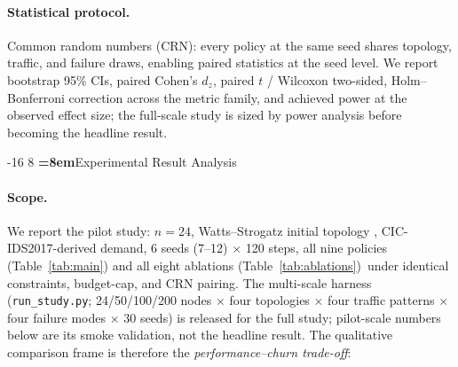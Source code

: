 \documentclass[runningheads]{llncs}
\makeatletter
\renewcommand\section{\@startsection{section}{1}{\z@}%
  {-16\p@ \@plus -4\p@ \@minus -4\p@}%
  {8\p@ \@plus 4\p@ \@minus 4\p@}%
  {\normalfont\large\bfseries\boldmath\color{vitblue}%
   \rightskip=\z@ \@plus 8em\pretolerance=10000}}
\let\plens@section\section
\renewcommand\section{\clearpage\plens@section}
\makeatother
\begin{document}
\paragraph{Statistical protocol.}
Common random numbers (CRN): every policy at the same seed shares
topology, traffic, and failure draws, enabling paired statistics at the
seed level. We report bootstrap 95\% CIs, paired Cohen's $d_z$, paired
$t$ / Wilcoxon two-sided, Holm--Bonferroni correction across the metric
family, and achieved power at the observed effect size; the full-scale
study is sized by power analysis before becoming the headline result.

\section{Experimental Result Analysis}
\label{sec:results}

\paragraph{Scope.}
We report the pilot study: $n=24$, Watts--Strogatz initial topology
\cite{watts1998,barabasi1999}, CIC-IDS2017-derived demand, 6 seeds (7--12) $\times$
120 steps, all nine policies (Table~\ref{tab:main}) and all eight
ablations (Table~\ref{tab:ablations})\ under identical constraints,
budget-cap, and CRN pairing. The multi-scale harness
(\texttt{run\_study.py}; 24/50/100/200 nodes $\times$ four
topologies $\times$ four traffic patterns $\times$ four failure modes
$\times$ 30 seeds) is released for the full study; pilot-scale numbers
below are its smoke validation, not the headline result. The qualitative
comparison frame is therefore the \emph{performance--churn trade-off}:
\end{document}
